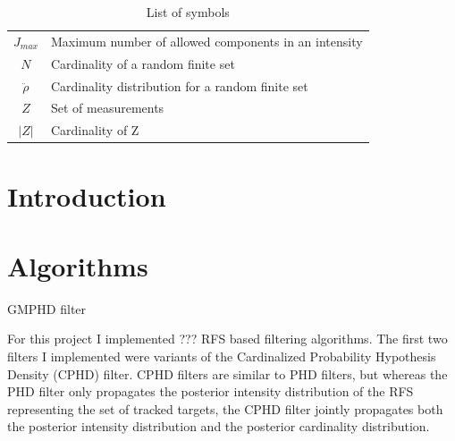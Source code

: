\documentclass{article}
\begin{document}
\begin{table}[h]
\begin{center}
\begin{tabular}{ c l }
      $J_{max}$& Maximum number of allowed components in an intensity \\
      $N$ & Cardinality of a random finite set \\
      $\ddot{\rho}$ & Cardinality distribution for a random finite set \\
      $Z$ & Set of measurements \\
      $|Z|$ & Cardinality of Z \\
    \end{tabular}
  \end{center}
  \caption{\label{tab:variables}List of symbols}
\end{table}

\section{Introduction}

\section{Algorithms}
GMPHD filter\cite{gmphd}

For this project I implemented ??? RFS based filtering algorithms. The first two filters I implemented were variants of the Cardinalized Probability Hypothesis Density (CPHD) filter. CPHD filters are similar to PHD filters, but whereas the PHD filter only propagates the posterior intensity distribution of the RFS representing the set of tracked targets, the CPHD filter jointly propagates both the posterior intensity distribution and the posterior cardinality distribution.
\end{document}
